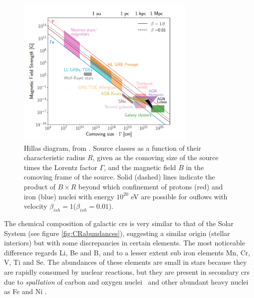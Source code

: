 \documentclass[main.tex]{subfiles}
\begin{document}
       \begin{figure}
        \centering
        \includegraphics[width=0.77\textwidth]{Pictures/hillasdiagram.pdf}
        \caption{Hillas diagram, from \cite{2019openquestionsUHECR}. Source classes as a function of their characteristic radius $R$, given as the comoving size of the source times the Lorentz factor $\Gamma$, and the magnetic field $B$ in the comoving frame of the source. Solid (dashed) lines indicate the product of $B \times R$ beyond which confinement of protons (red) and iron (blue) nuclei with energy $10^{20}$ eV are possible for ouflows with velocity $\beta_{ish} = 1$($\beta_{ish} = 0.01$).}
        \label{fig:hillasdiag}
    \end{figure}
    
    The chemical composition of galactic \glspl{cr} is very similar to that of the Solar System (see figure \ref{fig:CRabundances}), suggesting a similar origin (stellar interiors) but with some discrepancies in certain elements. The most noticeable difference regards Li, Be and B, and to a lesser extent sub iron elements Mn, Cr, V, Ti and Se. The abundances of these elements are small in stars because they are rapidly consumed by nuclear reactions, but they are present in secondary \glspl{cr} due to \textit{spallation} of carbon and oxygen nuclei~\cite{particleastrophy} and other abundant heavy nuclei as Fe and Ni \cite{2018particleacceleration}.
    
\end{document}
